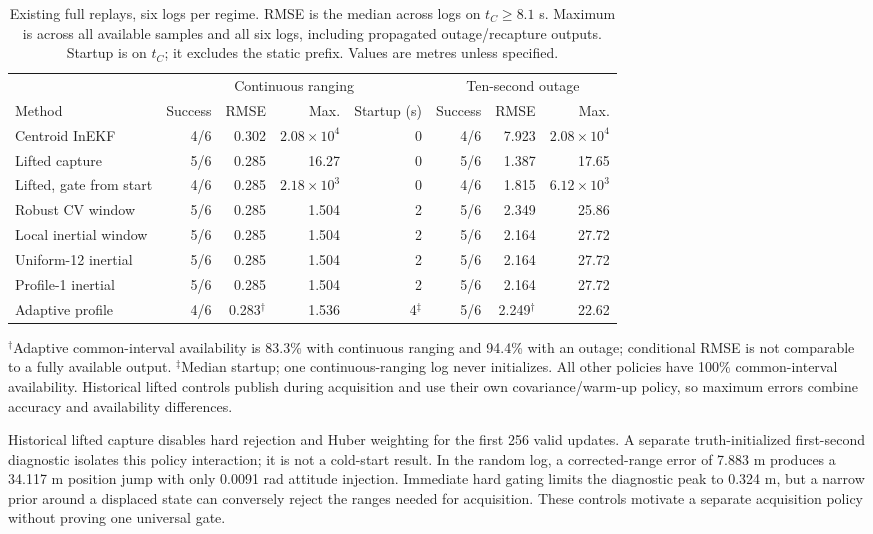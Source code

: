 \documentclass[conference,letterpaper,10pt]{IEEEtran}
\begin{document}
\begin{table}[t]
\caption{Existing full replays, six logs per regime. RMSE is the median across logs on $t_C\ge8.1$ s. Maximum is across all available samples and all six logs, including propagated outage/recapture outputs. Startup is on $t_C$; it excludes the static prefix. Values are metres unless specified.}
\centering
\setlength{\tabcolsep}{5pt}
\begin{tabular}{lrrrrrrr}
\toprule
&\multicolumn{4}{c}{Continuous ranging}&\multicolumn{3}{c}{Ten-second outage}\\
\cmidrule(lr){2-5}\cmidrule(lr){6-8}
Method&Success&RMSE&Max.&Startup (s)&Success&RMSE&Max.\\
\midrule
Centroid InEKF&4/6&0.302&$2.08\times10^4$&0&4/6&7.923&$2.08\times10^4$\\
Lifted capture&5/6&0.285&16.27&0&5/6&1.387&17.65\\
Lifted, gate from start&4/6&0.285&$2.18\times10^3$&0&4/6&1.815&$6.12\times10^3$\\
Robust CV window&5/6&0.285&1.504&2&5/6&2.349&25.86\\
Local inertial window&5/6&0.285&1.504&2&5/6&2.164&27.72\\
Uniform-12 inertial&5/6&0.285&1.504&2&5/6&2.164&27.72\\
Profile-1 inertial&5/6&0.285&1.504&2&5/6&2.164&27.72\\
Adaptive profile&4/6&0.283$^\dagger$&1.536&4$^\ddagger$&5/6&2.249$^\dagger$&22.62\\
\bottomrule
\end{tabular}
\par\vspace{3pt}\footnotesize
$^\dagger$Adaptive common-interval availability is 83.3\% with continuous ranging and 94.4\% with an outage; conditional RMSE is not comparable to a fully available output.
$^\ddagger$Median startup; one continuous-ranging log never initializes. All other policies have 100\% common-interval availability. Historical lifted controls publish during acquisition and use their own covariance/warm-up policy, so maximum errors combine accuracy and availability differences.
\end{table}

Historical lifted capture disables hard rejection and Huber weighting for the first 256 valid updates. A separate truth-initialized first-second diagnostic isolates this policy interaction; it is not a cold-start result. In the random log, a corrected-range error of 7.883 m produces a 34.117 m position jump with only 0.0091 rad attitude injection. Immediate hard gating limits the diagnostic peak to 0.324 m, but a narrow prior around a displaced state can conversely reject the ranges needed for acquisition. These controls motivate a separate acquisition policy without proving one universal gate.
\end{document}
